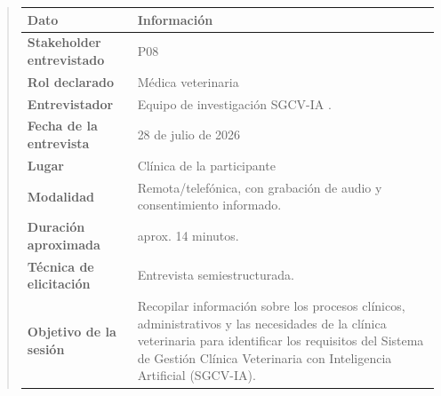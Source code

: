 \documentclass[
]{article}
\newcounter{none} %
\begin{document}
\begin{quote}
{\def\LTcaptype{none} %
\begin{longtable}[]{|
  >{\raggedright\arraybackslash}p{}|
  >{\raggedright\arraybackslash}p{}|}
\hline
\begin{minipage}[b]{\linewidth}\centering
\textbf{Dato}
\end{minipage} & \begin{minipage}[b]{\linewidth}\centering
\textbf{Información}
\end{minipage} \\
\hline
\endhead
\hline
\endlastfoot
\textbf{Stakeholder entrevistado} & \begin{minipage}[t]{\linewidth}\raggedright
P08
\end{minipage} \\
\hline
\textbf{Rol declarado} & \begin{minipage}[t]{\linewidth}\raggedright
Médica veterinaria
\end{minipage} \\
\hline
\textbf{Entrevistador} & \begin{minipage}[t]{\linewidth}\raggedright
Equipo de investigación SGCV-IA .
\end{minipage} \\
\hline
\textbf{Fecha de la entrevista} & \begin{minipage}[t]{\linewidth}\raggedright
28 de julio de 2026
\end{minipage} \\
\hline
\textbf{Lugar} & \begin{minipage}[t]{\linewidth}\raggedright
Clínica de la participante
\end{minipage} \\
\hline
\textbf{Modalidad} & \begin{minipage}[t]{\linewidth}\raggedright
Remota/telefónica, con grabación de audio y consentimiento informado.
\end{minipage} \\
\hline
\textbf{Duración aproximada} & \begin{minipage}[t]{\linewidth}\raggedright
aprox. 14 minutos.
\end{minipage} \\
\hline
\textbf{Técnica de elicitación} & \begin{minipage}[t]{\linewidth}\raggedright
Entrevista semiestructurada.
\end{minipage} \\
\hline
\textbf{Objetivo de la sesión} & \begin{minipage}[t]{\linewidth}\raggedright
Recopilar información sobre los procesos clínicos, administrativos y las necesidades de la clínica veterinaria para identificar los requisitos del Sistema de Gestión Clínica Veterinaria con Inteligencia Artificial (SGCV-IA).
\end{minipage} \\
\hline
\end{longtable}
}


\end{quote}
\end{document}
